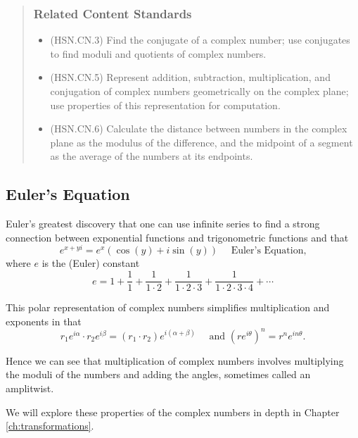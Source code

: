 \documentclass[
]{book}
\providecommand{\tightlist}{%
  \setlength{\itemsep}{0pt}\setlength{\parskip}{0pt}}
\theoremstyle{definition}
\theoremstyle{definition}
\theoremstyle{definition}
\theoremstyle{remark}
\begin{document}
\begin{quote}
\hypertarget{related-content-standards-20}{%
\subsubsection*{Related Content Standards}\label{related-content-standards-20}}

\begin{itemize}
\tightlist
\item
  (HSN.CN.3) Find the conjugate of a complex number; use conjugates to find moduli and quotients of complex numbers.
\item
  (HSN.CN.5) Represent addition, subtraction, multiplication, and conjugation of complex numbers geometrically on the complex plane; use properties of this representation for computation.
\item
  (HSN.CN.6) Calculate the distance between numbers in the complex plane as the modulus of the difference, and the midpoint of a segment as the average of the numbers at its endpoints.
\end{itemize}
\end{quote}

\hypertarget{eulers-equation}{%
\subsection{Euler's Equation}\label{eulers-equation}}

Euler's \citeyearpar{Euler} greatest discovery that one can use infinite series to find a strong connection between exponential functions and trigonometric functions and that
\[e^{x+yi} = e^x \left( \cos(y) + i \sin(y)\right) \quad \mbox{ Euler's Equation,}\] where \(e\) is the (Euler) constant \[e= 1 + \frac{1}{1} + \frac{1}{1\cdot 2} + \frac{1}{1\cdot 2 \cdot 3} + \frac{1}{1\cdot 2\cdot 3\cdot 4} + \cdots\]

This polar representation of complex numbers simplifies multiplication and exponents in that
\[r_1 e^{i\alpha} \cdot r_2 e^{i\beta} = (r_1\cdot r_2) e^{i(\alpha+\beta)} \quad \mbox{ and } \left(r e^{i\theta}\right)^n = r^n e^{in\theta}.\]

Hence we can see that multiplication of complex numbers involves multiplying the moduli of the numbers and adding the angles, sometimes called an amplitwist.

We will explore these properties of the complex numbers in depth in Chapter \ref{ch:transformations}.
\end{document}
